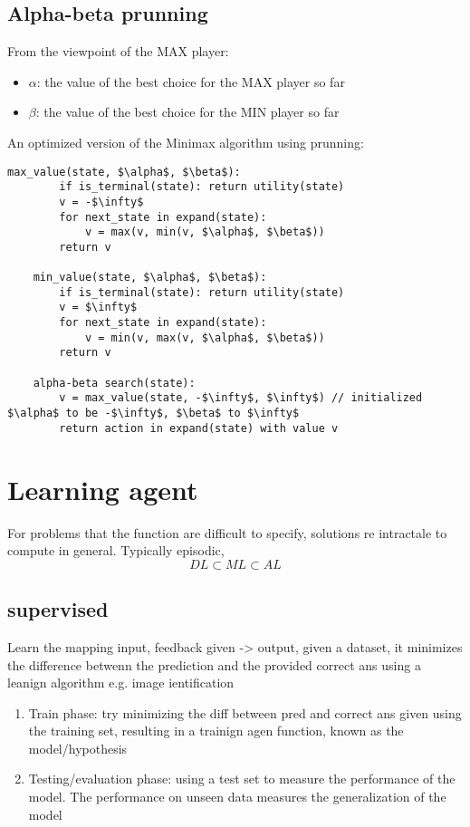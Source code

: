 \documentclass{article}
\begin{document}
\subsection{Alpha-beta prunning}
From the viewpoint of the MAX player:
\begin{itemize}
    \item $\alpha$: the value of the best choice for the MAX player so far
    \item $\beta$: the value of the best choice for the MIN player so far
\end{itemize}
An optimized version of the Minimax algorithm using prunning:
\begin{lstlisting}[mathescape=true]
    max_value(state, $\alpha$, $\beta$):
        if is_terminal(state): return utility(state)
        v = -$\infty$
        for next_state in expand(state):
            v = max(v, min(v, $\alpha$, $\beta$))
        return v
    
    min_value(state, $\alpha$, $\beta$):
        if is_terminal(state): return utility(state)
        v = $\infty$
        for next_state in expand(state):
            v = min(v, max(v, $\alpha$, $\beta$))
        return v

    alpha-beta search(state): 
        v = max_value(state, -$\infty$, $\infty$) // initialized $\alpha$ to be -$\infty$, $\beta$ to $\infty$
        return action in expand(state) with value v
\end{lstlisting}















\section{Learning agent }
For problems that the function are difficult to specify, solutions re intractale to compute in general. Typically episodic, 
\[DL\subset ML\subset AL\]
\subsection{supervised}
Learn the mapping input, feedback given -> output, given a dataset, 
it minimizes the difference betwenn the prediction and the provided correct ans
using a leanign algorithm  e.g. image ientification
\begin{enumerate}
    \item Train phase: try minimizing the diff between pred and correct ans given using the training set, 
    resulting in a trainign agen function, known as the model/hypothesis
    \item Testing/evaluation phase: using a test set to measure the performance of the model. 
    The performance on unseen data measures the generalization of the model 
\end{enumerate}
\end{document}
